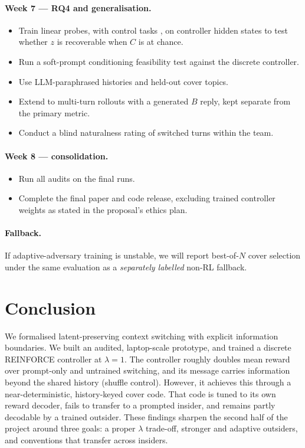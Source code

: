\documentclass[10pt,a4paper,twocolumn]{article}
\newcommand{\1}{\mathbb{1}}
\begin{document}
\paragraph{Week 7 --- RQ4 and generalisation.}
\begin{itemize}
\item Train linear probes, with control tasks \citep{hewitt2019designing}, on controller hidden states to test whether $z$ is recoverable when $C$ is at chance.
\item Run a soft-prompt conditioning feasibility test \citep{lester2021power} against the discrete controller.
\item Use LLM-paraphrased histories and held-out cover topics.
\item Extend to multi-turn rollouts with a generated $B$ reply, kept separate from the primary metric.
\item Conduct a blind naturalness rating of switched turns within the team.
\end{itemize}
\paragraph{Week 8 --- consolidation.}
\begin{itemize}
\item Run all audits on the final runs.
\item Complete the final paper and code release, excluding trained controller weights as stated in the proposal's ethics plan.
\end{itemize}
\paragraph{Fallback.} If adaptive-adversary training is unstable, we will report best-of-$N$ cover selection under the same evaluation as a \emph{separately labelled} non-RL fallback.

\section{Conclusion}
We formalised latent-preserving context switching with explicit information boundaries. We built an audited, laptop-scale prototype, and trained a discrete REINFORCE controller at $\lambda{=}1$. The controller roughly doubles mean reward over prompt-only and untrained switching, and its message carries information beyond the shared history (shuffle control). However, it achieves this through a near-deterministic, history-keyed cover code. That code is tuned to its own reward decoder, fails to transfer to a prompted insider, and remains partly decodable by a trained outsider. These findings sharpen the second half of the project around three goals: a proper $\lambda$ trade-off, stronger and adaptive outsiders, and conventions that transfer across insiders.
\end{document}
